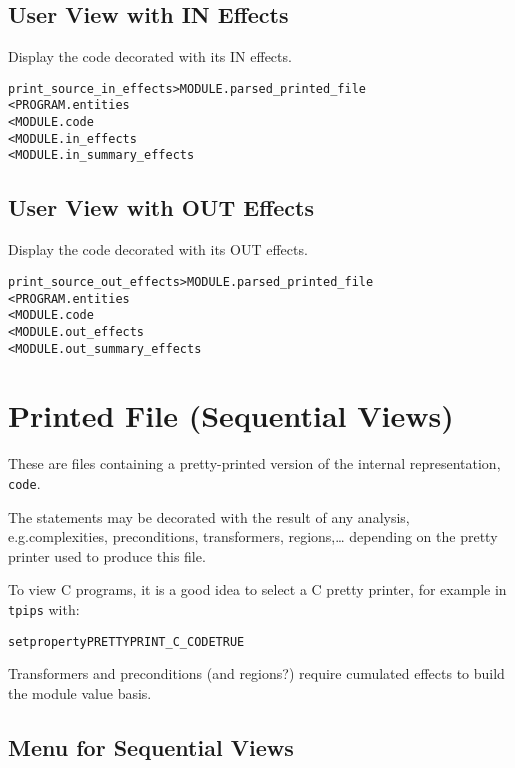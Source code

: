 \documentclass[a4paper]{report}
\newenvironment{PipsMake}{\begin{alltt}}{\end{alltt}}
\begin{document}
\subsection{User View with IN Effects}
Display the code decorated with its IN effects.

\begin{PipsMake}
print_source_in_effects       > MODULE.parsed_printed_file
        < PROGRAM.entities
        < MODULE.code
        < MODULE.in_effects
        < MODULE.in_summary_effects
\end{PipsMake}

\subsection{User View with OUT Effects}
Display the code decorated with its OUT effects.

\begin{PipsMake}
print_source_out_effects       > MODULE.parsed_printed_file
        < PROGRAM.entities
        < MODULE.code
        < MODULE.out_effects
        < MODULE.out_summary_effects
\end{PipsMake}



\section{Printed File (Sequential Views)}

These are files containing a pretty-printed version of the internal
representation, \verb+code+.

The statements may be decorated with the result of any analysis,
e.g.complexities, preconditions, transformers, regions,\ldots{} depending on
the pretty printer used to produce this file.

To view C programs, it is a good idea to select a C pretty printer, for
example in \texttt{tpips} with:
\begin{alltt}
setproperty PRETTYPRINT_C_CODE TRUE
\end{alltt}

Transformers and preconditions (and regions?) require cumulated effects
to build the module value basis.

\subsection{Menu for Sequential Views}
\end{document}
